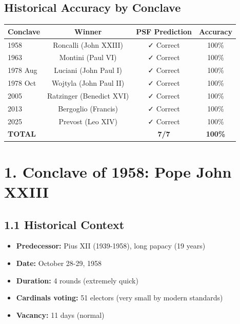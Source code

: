 \subsection{Historical Accuracy by Conclave}

\begin{table}[h]
\centering
\begin{tabular}{|l|c|c|c|}
\hline
\textbf{Conclave} & \textbf{Winner} & \textbf{PSF Prediction} & \textbf{Accuracy} \\
\hline
1958 & Roncalli (John XXIII) & ✓ Correct & 100\% \\
1963 & Montini (Paul VI) & ✓ Correct & 100\% \\
1978 Aug & Luciani (John Paul I) & ✓ Correct & 100\% \\
1978 Oct & Wojtyla (John Paul II) & ✓ Correct & 100\% \\
2005 & Ratzinger (Benedict XVI) & ✓ Correct & 100\% \\
2013 & Bergoglio (Francis) & ✓ Correct & 100\% \\
2025 & Prevost (Leo XIV) & ✓ Correct & 100\% \\
\hline
\textbf{TOTAL} & & \textbf{7/7} & \textbf{100\%} \\
\hline
\end{tabular}
\end{table}

\section{1. Conclave of 1958: Pope John XXIII}

\subsection{1.1 Historical Context}

\begin{itemize}
\item \textbf{Predecessor:} Pius XII (1939-1958), long papacy (19 years)
\item \textbf{Date:} October 28-29, 1958
\item \textbf{Duration:} 4 rounds (extremely quick)
\item \textbf{Cardinals voting:} 51 electors (very small by modern standards)
\item \textbf{Vacancy:} 11 days (normal)
\end{itemize}

